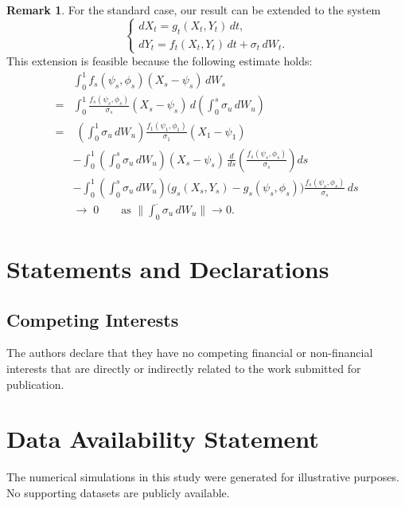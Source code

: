 \documentclass{article}
\theoremstyle{definition}  %
\newtheorem{remark}{Remark}
\theoremstyle{plain}  %
\begin{document}
   \begin{remark}
    For the standard  case, our result can be extended to the system
    \begin{equation}
        \begin{cases}
            dX_t = g_t(X_t,Y_t) \, dt, \\[4pt]
            dY_t = f_t(X_t,Y_t) \, dt + \sigma_t \, dW_t.
        \end{cases}
    \end{equation}
    This extension is feasible because the following estimate holds:
    \begin{align*}
        &\int_0^1 f_s(\psi_s,\phi_s)(X_s-\psi_s)\,dW_s \\
        =&\int_0^1 \frac{f_s(\psi_s,\phi_s)}{\sigma_s}(X_s-\psi_s)\,
           d\!\left(\int_0^s \sigma_u\,dW_u\right)\\
        =&\; \left(\int_0^1 \sigma_u\,dW_u\right)
           \frac{f_1(\psi_1,\phi_1)}{\sigma_1}(X_1-\psi_1) \\
          &-\int_0^1\!\left(\int_0^s \sigma_u\,dW_u\right)(X_s-\psi_s)\,
           \frac{d}{ds}\!\left(\frac{f_s(\psi_s,\phi_s)}{\sigma_s}\right)ds \\
          &-\int_0^1\!\left(\int_0^s \sigma_u\,dW_u\right)\!\bigl(
           g_s(X_s,Y_s)-g_s(\psi_s,\phi_s)\bigr)
           \frac{f_s(\psi_s,\phi_s)}{\sigma_s}\,ds \\
        &\to\;0 \qquad \text{as } \biggl\|\int_0^{\cdot} \sigma_u\,dW_u\biggr\|\to 0.
    \end{align*}
\end{remark}

\section*{Statements and Declarations}

\subsection*{Competing Interests}
The authors declare that they have no competing financial or non-financial interests that are directly or indirectly related to the work submitted for publication.

\section*{Data Availability Statement}
The numerical simulations in this study were generated for illustrative purposes. 
No supporting datasets are publicly available.




\end{document}

